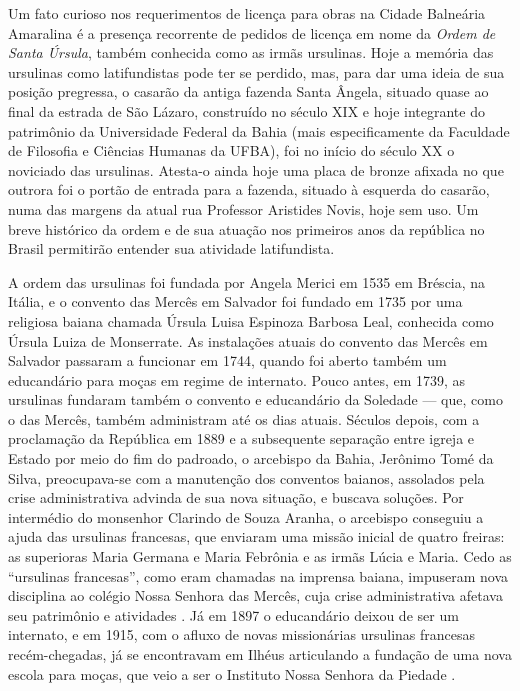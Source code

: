 
Um fato curioso nos requerimentos de licença para obras na Cidade Balneária Amaralina é a presença recorrente de pedidos de licença em nome da \textit{Ordem de Santa Úrsula}, também conhecida como as irmãs ursulinas. Hoje a memória das ursulinas como latifundistas pode ter se perdido, mas, para dar uma ideia de sua posição pregressa, o casarão da antiga fazenda Santa Ângela, situado quase ao final da estrada de São Lázaro, construído no século XIX e hoje integrante do patrimônio da Universidade Federal da Bahia (mais especificamente da Faculdade de Filosofia e Ciências Humanas da UFBA), foi no início do século XX o noviciado das ursulinas. Atesta-o ainda hoje uma placa de bronze afixada no que outrora foi o portão de entrada para a fazenda, situado à esquerda do casarão, numa das margens da atual rua Professor Aristides Novis, hoje sem uso. Um breve histórico da ordem e de sua atuação nos primeiros anos da república no Brasil permitirão entender sua atividade latifundista.

A ordem das ursulinas foi fundada por Angela Merici em 1535 em Bréscia, na Itália, e o convento das Mercês em Salvador foi fundado em 1735 por uma religiosa baiana chamada Úrsula Luisa Espinoza Barbosa Leal, conhecida como Úrsula Luiza de Monserrate. As instalações atuais do convento das Mercês em Salvador passaram a funcionar em 1744, quando foi aberto também um educandário para moças em regime de internato. Pouco antes, em 1739, as ursulinas fundaram também o convento e educandário da Soledade --- que, como o das Mercês, também administram até os dias atuais. Séculos depois, com a proclamação da República em 1889 e a subsequente separação entre igreja e Estado por meio do fim do padroado, o arcebispo da Bahia, Jerônimo Tomé da Silva, preocupava-se com a manutenção dos conventos baianos, assolados pela crise administrativa advinda de sua nova situação, e buscava soluções. Por intermédio do monsenhor Clarindo de Souza Aranha, o arcebispo conseguiu a ajuda das ursulinas francesas, que enviaram uma missão inicial de quatro freiras: as superioras Maria Germana e Maria Febrônia e as irmãs Lúcia e Maria. Cedo as ``ursulinas francesas'', como eram chamadas na imprensa baiana, impuseram nova disciplina ao colégio Nossa Senhora das Mercês, cuja crise administrativa afetava seu patrimônio e atividades \cite[p.~224]{menezes_modernizacao_2002}. Já em 1897 o educandário deixou de ser um internato, e em 1915, com o afluxo de novas missionárias ursulinas francesas recém-chegadas, já se encontravam em Ilhéus articulando a fundação de uma nova escola para moças, que veio a ser o Instituto Nossa Senhora da Piedade \cite{barbosa_ursulinas_2016}.

